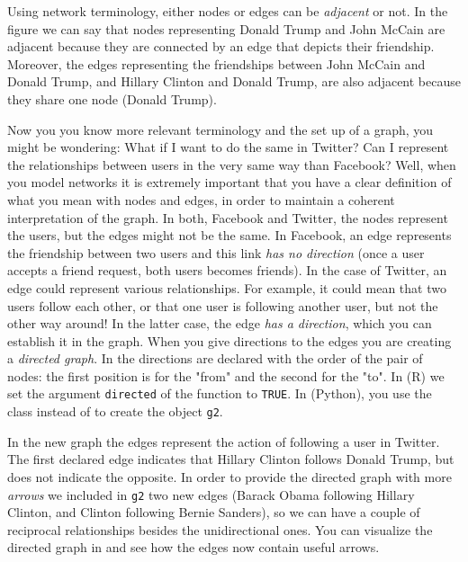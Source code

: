 
Using network terminology, either nodes or edges can be \textit{adjacent} or not. In the figure we can say that nodes representing Donald Trump and John McCain are adjacent because they are connected by an edge that depicts their friendship. Moreover, the edges representing the friendships between John McCain and Donald Trump, and Hillary Clinton and Donald Trump, are also adjacent because they share one node (Donald Trump).

Now you you know more relevant terminology and the set up of a graph, you might be wondering: What if I want to do the same in Twitter? Can I represent the relationships between users in the very same way than Facebook? Well, when you model networks it is extremely important that you have a clear definition of what you mean with nodes and edges, in order to maintain a coherent interpretation of the graph. In both, Facebook and Twitter, the nodes represent the users, but the edges might not be the same. In Facebook, an edge represents the friendship between two users and this link \textit{has no direction} (once a user accepts a friend request, both users becomes friends). In the case of Twitter, an edge could represent various relationships. For example, it could mean that two users follow each other, or that one user is following another user, but not the other way around! In the latter case, the edge \textit{has a direction}, which you can establish it in the graph. When you give directions to the edges you are creating a \textit{directed graph}. In  the directions are declared with the order of the pair of nodes: the first position is for the "from" and the second for the "to". In  (R) we  set the argument \verb+directed+ of the function  to \verb+TRUE+. In  (Python), you use the class  instead of  to create the object \texttt{g2}.


In the new graph the edges represent the action of following a user in Twitter. The first declared edge indicates that Hillary Clinton follows Donald Trump, but does not indicate the opposite. In order to provide the directed graph with more \textit{arrows} we included in \texttt{g2} two new edges (Barack Obama following Hillary Clinton, and Clinton following Bernie Sanders), so we can have a couple of reciprocal relationships besides the unidirectional ones. You can visualize the directed graph in  and see how the edges now contain useful arrows.

